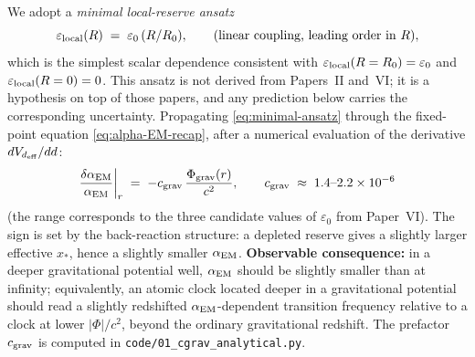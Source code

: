 \documentclass[11pt,a4paper]{article}
\begin{document}
We adopt a \emph{minimal local-reserve ansatz}
\begin{equation}
\varepsilon_{\rm local}(R) \;=\; \varepsilon_0\,(R/R_0),
\qquad \text{(linear coupling, leading order in } R \text{)},
\label{eq:minimal-ansatz}
\end{equation}
which is the simplest scalar dependence consistent with
$\varepsilon_{\rm local}(R = R_0) = \varepsilon_0$ and
$\varepsilon_{\rm local}(R = 0) = 0$. This ansatz is not derived
from Papers~II and~VI; it is a hypothesis on top of those
papers, and any prediction below carries the corresponding
uncertainty. Propagating \eqref{eq:minimal-ansatz} through the
fixed-point equation \eqref{eq:alpha-EM-recap}, after a
numerical evaluation of the derivative $dV_{d_{\rm eff}}/dd$:
\begin{equation}
\frac{\delta\alpha_{\rm EM}}{\alpha_{\rm EM}}\bigg|_r
\;=\; - c_{\rm grav}\,\frac{\Phi_{\rm grav}(r)}{c^2},
\qquad
c_{\rm grav} \;\approx\; 1.4\text{--}2.2 \times 10^{-6}
\label{eq:dalpha-grav}
\end{equation}
(the range corresponds to the three candidate values of
$\varepsilon_0$ from Paper~VI). The sign is set by the
back-reaction structure: a depleted reserve gives a slightly
larger effective $x_*$, hence a slightly smaller
$\alpha_{\rm EM}$. \textbf{Observable consequence:} in a deeper
gravitational potential well, $\alpha_{\rm EM}$ should be
slightly smaller than at infinity; equivalently, an atomic clock
located deeper in a gravitational potential should read a
slightly redshifted $\alpha_{\rm EM}$-dependent transition
frequency relative to a clock at lower $|\Phi|/c^2$, beyond the
ordinary gravitational redshift. The prefactor $c_{\rm grav}$ is
computed in \texttt{code/01\_cgrav\_analytical.py}.
\end{document}
